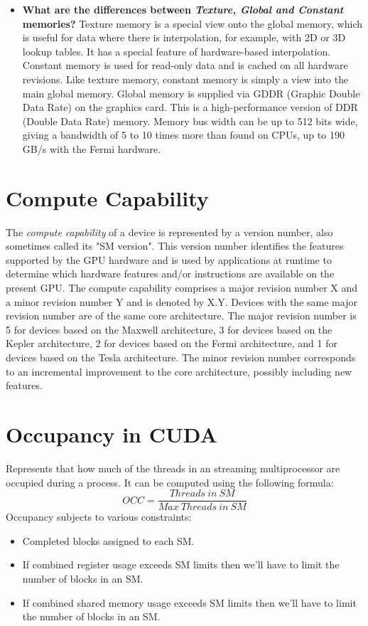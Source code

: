 \documentclass[12pt]{article}
\numberwithin{equation}{section}
\numberwithin{table}{section}
\numberwithin{figure}{section}
\begin{document}
\begin{itemize}
	\item \textbf{What are the differences between \textit{Texture, Global and Constant} memories?} Texture memory is a special view onto the global memory, which is useful for data where there is interpolation, for example, with 2D or 3D lookup tables. It has a special feature of
	hardware-based interpolation. Constant memory is used for read-only data and is cached on all
	hardware revisions. Like texture memory, constant memory is simply a view into the main global
	memory.
	Global memory is supplied via GDDR (Graphic Double Data Rate) on the graphics card. This is
	a high-performance version of DDR (Double Data Rate) memory. Memory bus width can be up to 512 bits
	wide, giving a bandwidth of 5 to 10 times more than found on CPUs, up to 190 GB/s with the Fermi
	hardware.
\end{itemize}

\section{Compute Capability}
The \textit{compute capability} of a device is represented by a version number, also sometimes
called its "SM version". This version number identifies the features supported by the
GPU hardware and is used by applications at runtime to determine which hardware
features and/or instructions are available on the present GPU.
The compute capability comprises a major revision number X and a minor revision
number Y and is denoted by X.Y.
Devices with the same major revision number are of the same core architecture. The
major revision number is 5 for devices based on the Maxwell architecture, 3 for devices
based on the Kepler architecture, 2 for devices based on the Fermi architecture, and 1 for
devices based on the Tesla architecture.
The minor revision number corresponds to an incremental improvement to the core
architecture, possibly including new features.
\section{Occupancy in CUDA}
Represents that how much of the threads in an streaming multiprocessor are occupied during a process. It can be computed using the following formula:
\begin{equation}
	OCC = \frac{Threads\ in\ SM}{Max\ Threads\ in\ SM}
\end{equation}
Occupancy subjects to various constraints:
\begin{itemize}
	\item Completed blocks assigned to each SM.
	\item If combined register usage exceeds SM limits then we'll have to limit the number of blocks in an SM.
	\item If combined shared memory usage exceeds SM limits then we'll have to limit the number of blocks in an SM.
\end{itemize}
\end{document}
